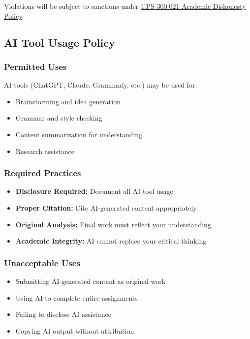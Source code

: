 \documentclass[11pt]{scrartcl} %
\begin{document}
Violations will be subject to sanctions under \href{https://www.fullerton.edu/senate/publications_policies_resolutions/ups/UPS%20300/UPS%20300.021.pdf}{UPS 300.021 Academic Dishonesty Policy}.

\subsection{AI Tool Usage Policy}

\subsubsection{Permitted Uses}
AI tools (ChatGPT, Claude, Grammarly, etc.) may be used for:
\begin{itemize}
\item Brainstorming and idea generation
\item Grammar and style checking
\item Content summarization for understanding
\item Research assistance
\end{itemize}

\subsubsection{Required Practices}
\begin{itemize}
\item \textbf{Disclosure Required:} Document all AI tool usage
\item \textbf{Proper Citation:} Cite AI-generated content appropriately
\item \textbf{Original Analysis:} Final work must reflect your understanding
\item \textbf{Academic Integrity:} AI cannot replace your critical thinking
\end{itemize}

\subsubsection{Unacceptable Uses}
\begin{itemize}
\item Submitting AI-generated content as original work
\item Using AI to complete entire assignments
\item Failing to disclose AI assistance
\item Copying AI output without attribution
\end{itemize}
\end{document}
